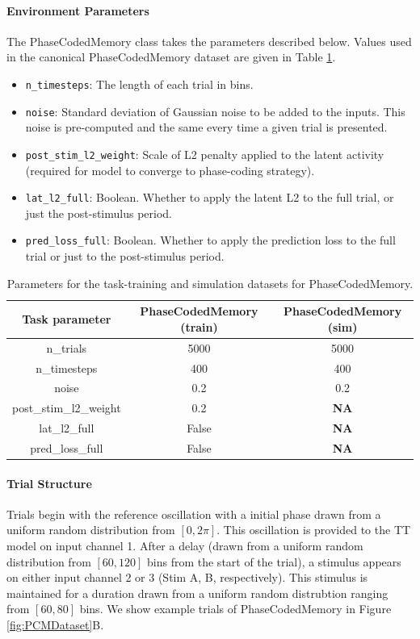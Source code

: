 \documentclass{article}
\begin{document}
\paragraph{Environment Parameters}
The PhaseCodedMemory class takes the parameters described below. Values used in the canonical PhaseCodedMemory dataset are given in Table \ref{table:PCMTrain}.
\begin{itemize}
    \item \texttt{n\_timesteps}: The length of each trial in bins.
    \item \texttt{noise}: Standard deviation of Gaussian noise to be added to the inputs. This noise is pre-computed and the same every time a given trial is presented.
    \item \texttt{post\_stim\_l2\_weight}: Scale of L2 penalty applied to the latent activity (required for model to converge to phase-coding strategy).
    \item \texttt{lat\_l2\_full}: Boolean. Whether to apply the latent L2 to the full trial, or just the post-stimulus period.
    \item \texttt{pred\_loss\_full}: Boolean. Whether to apply the prediction loss to the full trial or just to the post-stimulus period.
\end{itemize}

\begin{table}[ht]
\centering
\begin{tabular}{|c|c|c|}
\hline
\textbf{Task parameter} & \textbf{PhaseCodedMemory (train)} & \textbf{PhaseCodedMemory (sim)}  \\ \hline
n\_trials &  5000 & 5000  \\ \hline
n\_timesteps &  400 & 400  \\ \hline
noise &  0.2 & 0.2 \\ \hline
post\_stim\_l2\_weight & 0.2 & \textbf{NA} \\ \hline
lat\_l2\_full & False & \textbf{NA}  \\ \hline
pred\_loss\_full & False & \textbf{NA}  \\ \hline
\end{tabular}
\caption{Parameters for the task-training and simulation datasets for PhaseCodedMemory.}
\label{table:PCMTrain}
\end{table}
\vspace{-0.3cm}
\paragraph{Trial Structure}
Trials begin with the reference oscillation with a initial phase drawn from a uniform random distribution from $[0, 2\pi]$. This oscillation is provided to the TT model on input channel 1. After a delay (drawn from a uniform random distribution from $[60, 120]$ bins from the start of the trial), a stimulus appears on either input channel 2 or 3 (Stim A, B, respectively). This stimulus is maintained for a duration drawn from a uniform random distrubtion ranging from $[60, 80]$ bins. We show example trials of PhaseCodedMemory in Figure \ref{fig:PCMDataset}B.
\end{document}
